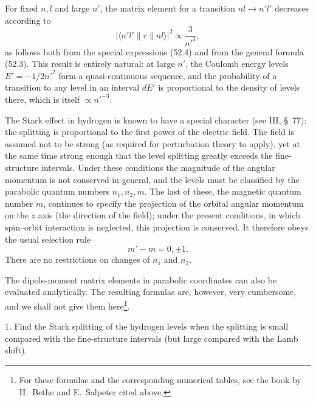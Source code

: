 For fixed $n,l$ and large $n'$, the matrix element for a transition $nl\to n'l'$ decreases according to
\begin{equation}
|\langle n'l'\|r\|nl\rangle|^2\propto\frac3{n'^3},
\tag{52.9}
\end{equation}
as follows both from the special expressions (52.4) and from the general formula (52.3). This result is entirely natural: at large $n'$, the Coulomb energy levels $E'=-1/2n'^2$ form a quasi-continuous sequence, and the probability of a transition to any level in an interval $dE'$ is proportional to the density of levels there, which is itself $\propto n'^{-3}$.

The Stark effect in hydrogen is known to have a special character (see III, \S~77): the splitting is proportional to the first power of the electric field. The field is assumed not to be strong (as required for perturbation theory to apply), yet at the same time strong enough that the level splitting greatly exceeds the fine-structure intervals. Under these conditions the magnitude of the angular momentum is not conserved in general, and the levels must be classified by the parabolic quantum numbers $n_1,n_2,m$. The last of these, the magnetic quantum number $m$, continues to specify the projection of the orbital angular momentum on the $z$ axis (the direction of the field); under the present conditions, in which spin--orbit interaction is neglected, this projection is conserved. It therefore obeys the usual selection rule
\begin{equation}
m'-m=0,\pm1.
\tag{52.10}
\end{equation}
There are no restrictions on changes of $n_1$ and $n_2$.

The dipole-moment matrix elements in parabolic coordinates can also be evaluated analytically. The resulting formulas are, however, very cumbersome, and we shall not give them here\footnote{For these formulas and the corresponding numerical tables, see the book by H.~Bethe and E.~Salpeter cited above.}.

\ProblemHeading

1. Find the Stark splitting of the hydrogen levels when the splitting is small compared with the fine-structure intervals (but large compared with the Lamb shift).

